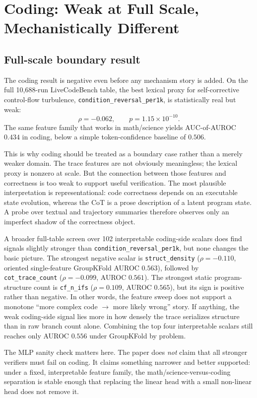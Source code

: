 \documentclass[10pt]{article}
\begin{document}
\section{Coding: Weak at Full Scale, Mechanistically Different}

\subsection{Full-scale boundary result}

The coding result is negative even before any mechanism story is added. On the full 10,688-run LiveCodeBench table, the best lexical proxy for self-corrective control-flow turbulence, \texttt{condition\_reversal\_per1k}, is statistically real but weak:
\[
\rho = -0.062,\qquad p = 1.15\times 10^{-10}.
\]
The same feature family that works in math/science yields AUC-of-AUROC $0.434$ in coding, below a simple token-confidence baseline of $0.506$.

This is why coding should be treated as a boundary case rather than a merely weaker domain. The trace features are not obviously meaningless; the lexical proxy is nonzero at scale. But the connection between those features and correctness is too weak to support useful verification. The most plausible interpretation is representational: code correctness depends on an executable state evolution, whereas the CoT is a prose description of a latent program state. A probe over textual and trajectory summaries therefore observes only an imperfect shadow of the correctness object.

A broader full-table screen over 102 interpretable coding-side scalars does find signals slightly stronger than \texttt{condition\_reversal\_per1k}, but none changes the basic picture. The strongest negative scalar is \texttt{struct\_density} ($\rho=-0.110$, oriented single-feature GroupKFold AUROC $0.563$), followed by \texttt{cot\_trace\_count} ($\rho=-0.099$, AUROC $0.561$). The strongest static program-structure count is \texttt{cf\_n\_ifs} ($\rho=0.109$, AUROC $0.565$), but its sign is positive rather than negative. In other words, the feature sweep does not support a monotone ``more complex code $\rightarrow$ more likely wrong'' story. If anything, the weak coding-side signal lies more in how densely the trace serializes structure than in raw branch count alone. Combining the top four interpretable scalars still reaches only AUROC $0.556$ under GroupKFold by problem.

The MLP sanity check matters here. The paper does \emph{not} claim that all stronger verifiers must fail on coding. It claims something narrower and better supported: under a fixed, interpretable feature family, the math/science-versus-coding separation is stable enough that replacing the linear head with a small non-linear head does not remove it.
\end{document}
